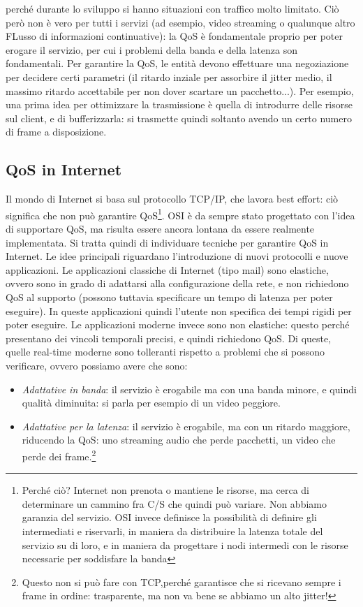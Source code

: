 perché durante lo sviluppo si hanno situazioni con traffico molto limitato. Ciò però non è vero per tutti i servizi
(ad esempio, video streaming o qualunque altro FLusso di informazioni continuative): la QoS è fondamentale proprio per
poter erogare il servizio, per cui i problemi della banda e della latenza son fondamentali. Per garantire la QoS, le
entità devono effettuare una negoziazione per decidere certi parametri (il ritardo inziale per assorbire il jitter
medio, il massimo ritardo accettabile per non dover scartare un pacchetto...). Per esempio, una prima idea per
ottimizzare la trasmissione è quella di introdurre delle risorse sul client, e di bufferizzarla: si trasmette quindi
soltanto avendo un certo numero di frame a disposizione.
\subsection{QoS in Internet}
Il mondo di Internet si basa sul protocollo TCP/IP, che lavora best effort: ciò significa che non può garantire
QoS\footnote{Perché ciò? Internet non prenota o mantiene le risorse, ma cerca di determinare un cammino fra C/S che
quindi può variare. Non abbiamo garanzia del servizio. OSI invece definisce la possibilità di definire gli intermediati
e riservarli, in maniera da distribuire la latenza totale del servizio su di loro, e in maniera da progettare i nodi
intermedi con le risorse necessarie per soddisfare la banda}. OSI è da sempre stato progettato con l'idea di supportare
QoS, ma risulta essere ancora lontana da essere realmente implementata. Si tratta quindi di individuare tecniche per
garantire QoS in Internet. Le idee principali riguardano l'introduzione di nuovi protocolli e nuove applicazioni.
Le applicazioni classiche di Internet (tipo mail) sono elastiche, ovvero sono in grado di adattarsi alla configurazione
della rete, e non richiedono QoS al supporto (possono tuttavia specificare un tempo di latenza per poter eseguire).
In queste applicazioni quindi l'utente non specifica dei tempi rigidi per poter eseguire.
Le applicazioni moderne invece sono non elastiche: questo perché presentano dei vincoli temporali precisi, e quindi
richiedono QoS. Di queste, quelle real-time moderne sono tolleranti rispetto a problemi che si possono verificare, 
ovvero possiamo avere che sono:
\begin{itemize}
 \item \textit{Adattative in banda}: il servizio è erogabile ma con una banda minore, e quindi qualità diminuita: si
 parla per esempio di un video peggiore.
 \item \textit{Adattative per la latenza}: il servizio è erogabile, ma con un ritardo maggiore, riducendo la QoS: uno
 streaming  audio che perde pacchetti, un video che perde dei frame.\footnote{Questo non si può fare con TCP,perché
garantisce  che si ricevano sempre i frame in ordine: trasparente, ma non va bene se abbiamo un alto jitter!}
\end{itemize}
